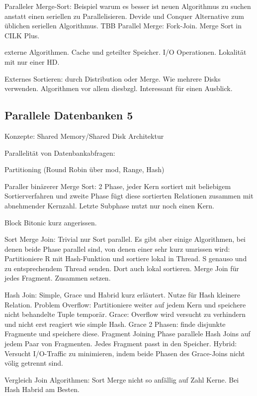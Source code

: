 \documentclass[a4paper,12pt,twoside]{article}
\begin{document}
Paralleler Merge-Sort: Beispiel warum es besser ist neuen Algorithmus zu suchen anstatt einen seriellen zu Parallelisieren. Devide und Conquer Alternative zum üblichen seriellen Algorithmus. TBB Parallel Merge: Fork-Join. Merge Sort in CILK Plus. 

\textbf{}

externe Algorithmen. Cache und geteilter Speicher. I/O Operationen. Lokalität mit nur einer HD. 

Externes Sortieren: durch Distribution oder Merge. Wie mehrere Disks verwenden. Algorithmen vor allem diesbzgl. Interessant für einen Ausblick.

\subsection{Parallele Datenbanken 5}
\textbf{}

Konzepte: Shared Memory/Shared Disk Architektur

Parallelität von Datenbankabfragen:

Partitioning (Round Robin über mod, Range, Hash)

Paraller binärerer Merge Sort: 2 Phase, jeder Kern sortiert mit beliebigem Sortierverfahren und zweite Phase fügt diese sortierten Relationen zusammen mit abnehmender Kernzahl. Letzte Subphase nutzt nur noch einen Kern.

Block Bitonic kurz angerissen. 

Sort Merge Join: Trivial nur Sort parallel. Es gibt aber einige Algorithmen, bei denen beide Phase parallel sind, von denen einer sehr kurz umrissen wird: Partitioniere R mit Hash-Funktion und sortiere lokal in Thread. S genauso und zu entsprechendem Thread senden. Dort auch lokal sortieren. Merge Join für jedes Fragment. Zusammen setzen.

Hash Join: Simple, Grace und Habrid kurz erläutert. Nutze für Hash kleinere Relation. Problem Overflow: Partitioniere weiter auf jedem Kern und speichere nicht behandelte Tuple temporär. Grace: Overflow wird versucht zu verhindern und nicht erst reagiert wie simple Hash. Grace 2 Phasen: finde disjunkte Fragmente und speichere diese. Fragment Joining Phase parallele Hash Joins auf jedem Paar von Fragmenten. Jedes Fragment passt in den Speicher. Hybrid: Versucht I/O-Traffic zu minimieren, indem beide Phasen des Grace-Joins nicht völig getrennt sind.

Vergleich Join Algorithmen: Sort Merge nicht so anfällig auf Zahl Kerne. Bei Hash Habrid am Besten.
\end{document}
